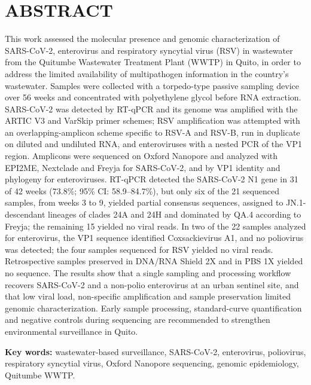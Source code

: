 \section{ABSTRACT}

This work assessed the molecular presence and genomic characterization of SARS-CoV-2, enterovirus and respiratory syncytial virus (RSV) in wastewater from the Quitumbe Wastewater Treatment Plant (WWTP) in Quito, in order to address the limited availability of multipathogen information in the country's wastewater. Samples were collected with a torpedo-type passive sampling device over 56 weeks and concentrated with polyethylene glycol before RNA extraction. SARS-CoV-2 was detected by RT-qPCR and its genome was amplified with the ARTIC V3 and VarSkip primer schemes; RSV amplification was attempted with an overlapping-amplicon scheme specific to RSV-A and RSV-B, run in duplicate on diluted and undiluted RNA, and enteroviruses with a nested PCR of the VP1 region. Amplicons were sequenced on Oxford Nanopore and analyzed with EPI2ME, Nextclade and Freyja for SARS-CoV-2, and by VP1 identity and phylogeny for enteroviruses. RT-qPCR detected the SARS-CoV-2 N1 gene in 31 of 42 weeks (73.8\%; 95\% CI: 58.9--84.7\%), but only six of the 21 sequenced samples, from weeks 3 to 9, yielded partial consensus sequences, assigned to JN.1-descendant lineages of clades 24A and 24H and dominated by QA.4 according to Freyja; the remaining 15 yielded no viral reads. In two of the 22 samples analyzed for enterovirus, the VP1 sequence identified Coxsackievirus A1, and no poliovirus was detected; the four samples sequenced for RSV yielded no viral reads. Retrospective samples preserved in DNA/RNA Shield 2X and in PBS 1X yielded no sequence. The results show that a single sampling and processing workflow recovers SARS-CoV-2 and a non-polio enterovirus at an urban sentinel site, and that low viral load, non-specific amplification and sample preservation limited genomic characterization. Early sample processing, standard-curve quantification and negative controls during sequencing are recommended to strengthen environmental surveillance in Quito.

\vspace{0.5\baselineskip}

\noindent\textbf{Key words:} wastewater-based surveillance, SARS-CoV-2, enterovirus, poliovirus, respiratory syncytial virus, Oxford Nanopore sequencing, genomic epidemiology, Quitumbe WWTP.
